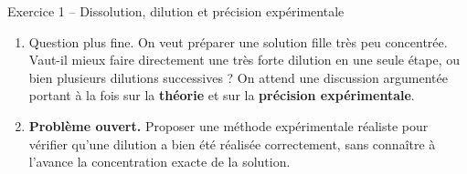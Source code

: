 \documentclass[11pt,a4paper]{article}
\begin{document}
\begin{exobox}{Exercice 1 -- Dissolution, dilution et précision expérimentale}
\begin{enumerate}[label=\textbf{\arabic*.}]
    \item Question plus fine.  
    On veut préparer une solution fille très peu concentrée.  
    Vaut-il mieux faire directement une très forte dilution en une seule étape, ou bien plusieurs dilutions successives ?  
    On attend une discussion argumentée portant à la fois sur la \textbf{théorie} et sur la \textbf{précision expérimentale}.

    \item \textbf{Problème ouvert.}  
    Proposer une méthode expérimentale réaliste pour vérifier qu’une dilution a bien été réalisée correctement, sans connaître à l’avance la concentration exacte de la solution.
\end{enumerate}
\end{exobox}

\end{document}
